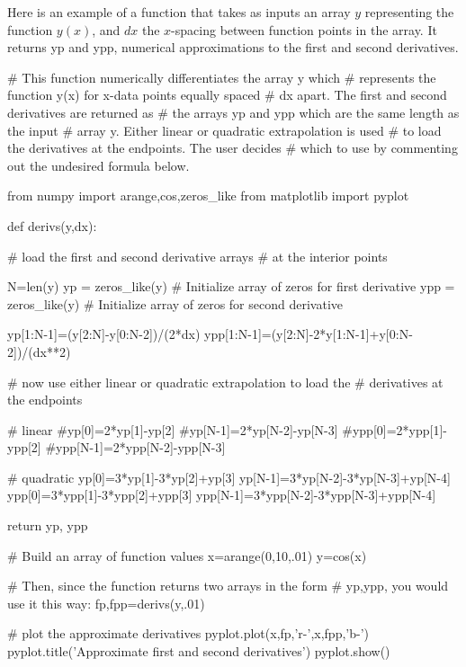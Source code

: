 Here is an example of a function that takes as inputs an array $y$
representing the function $y(x)$, and $dx$ the $x$-spacing between function
points in the array. It returns {\code yp} and {\code ypp}, numerical
approximations to the first and second derivatives. 

\begin{codeexample}[derivs.py]
\begin{VerbatimOut}{\listingFile}

# This function numerically differentiates the array y which
# represents the function y(x) for x-data points equally spaced
# dx apart.  The first and second derivatives are returned as
# the arrays yp and ypp which are the same length as the input
# array y.  Either linear or quadratic extrapolation is used
# to load the derivatives at the endpoints.  The user decides
# which to use by commenting out the undesired formula below.

from numpy import arange,cos,zeros_like
from matplotlib import pyplot

def derivs(y,dx):

    # load the first and second derivative arrays
    # at the interior points

    N=len(y)
    yp = zeros_like(y)  # Initialize array of zeros for first derivative
    ypp = zeros_like(y)  # Initialize array of zeros for second derivative

    yp[1:N-1]=(y[2:N]-y[0:N-2])/(2*dx)
    ypp[1:N-1]=(y[2:N]-2*y[1:N-1]+y[0:N-2])/(dx**2)

    # now use either linear or quadratic extrapolation to load the
    # derivatives at the endpoints


    # linear
    #yp[0]=2*yp[1]-yp[2]
    #yp[N-1]=2*yp[N-2]-yp[N-3]
    #ypp[0]=2*ypp[1]-ypp[2]
    #ypp[N-1]=2*ypp[N-2]-ypp[N-3]

    # quadratic
    yp[0]=3*yp[1]-3*yp[2]+yp[3]
    yp[N-1]=3*yp[N-2]-3*yp[N-3]+yp[N-4]
    ypp[0]=3*ypp[1]-3*ypp[2]+ypp[3]
    ypp[N-1]=3*ypp[N-2]-3*ypp[N-3]+ypp[N-4]

    return yp, ypp


# Build an array of function values
x=arange(0,10,.01)
y=cos(x)

# Then, since the function returns two arrays in the form
# yp,ypp, you would use it this way:
fp,fpp=derivs(y,.01)

# plot the approximate derivatives
pyplot.plot(x,fp,'r-',x,fpp,'b-')
pyplot.title('Approximate first and second derivatives')
pyplot.show()
\end{VerbatimOut}
\end{codeexample}

